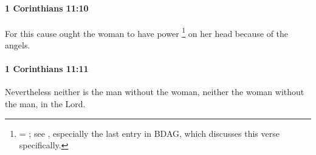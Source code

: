 		\paragraph{1 Corinthians 11:10} %
			\label{1CORINTHIANS-11-10}

			For this cause ought the woman to have power%
				\footnote{%
					= ; see \hyperref[EXOUSIA]{}, especially the last entry in BDAG, which discusses this verse specifically.
					}
			on her head because of the angels.

			\begin{framed}
			\scriptsize
				\begin{compactdesc}
					\item[SBLG] 
				\end{compactdesc}
			\end{framed}

		\paragraph{1 Corinthians 11:11} %
			\label{1CORINTHIANS-11-11}

			Nevertheless neither is the man without the woman, neither the woman without the man, in the Lord.

